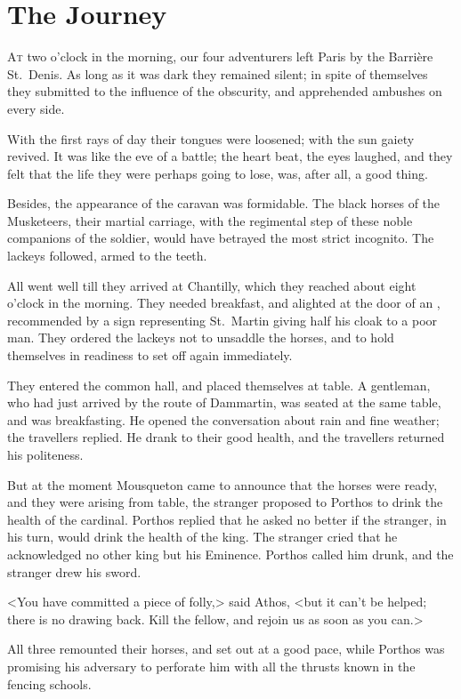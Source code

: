 
\chapter{The Journey}

\lettrine{A}{t} two o'clock in the morning, our four adventurers left Paris by the Barrière St.~Denis. As long as it was dark they remained silent; in spite of themselves they submitted to the influence of the obscurity, and apprehended ambushes on every side. 

With the first rays of day their tongues were loosened; with the sun gaiety revived. It was like the eve of a battle; the heart beat, the eyes laughed, and they felt that the life they were perhaps going to lose, was, after all, a good thing. 

Besides, the appearance of the caravan was formidable. The black horses of the Musketeers, their martial carriage, with the regimental step of these noble companions of the soldier, would have betrayed the most strict incognito. The lackeys followed, armed to the teeth. 

All went well till they arrived at Chantilly, which they reached about eight o'clock in the morning. They needed breakfast, and alighted at the door of an , recommended by a sign representing St.~Martin giving half his cloak to a poor man. They ordered the lackeys not to unsaddle the horses, and to hold themselves in readiness to set off again immediately. 

They entered the common hall, and placed themselves at table. A gentleman, who had just arrived by the route of Dammartin, was seated at the same table, and was breakfasting. He opened the conversation about rain and fine weather; the travellers replied. He drank to their good health, and the travellers returned his politeness. 

But at the moment Mousqueton came to announce that the horses were ready, and they were arising from table, the stranger proposed to Porthos to drink the health of the cardinal. Porthos replied that he asked no better if the stranger, in his turn, would drink the health of the king. The stranger cried that he acknowledged no other king but his Eminence. Porthos called him drunk, and the stranger drew his sword. 

<You have committed a piece of folly,> said Athos, <but it can't be helped; there is no drawing back. Kill the fellow, and rejoin us as soon as you can.> 

All three remounted their horses, and set out at a good pace, while Porthos was promising his adversary to perforate him with all the thrusts known in the fencing schools. 


